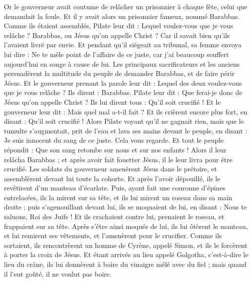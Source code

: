 \begin{multicols}{2}
Or le gouverneur avait coutume de relâcher un prisonnier à chaque fête, celui que demandait la foule.
Et il y avait alors un prisonnier fameux, nommé Barabbas.
Comme ils étaient assemblés, Pilate leur dit : Lequel voulez-vous que je vous relâche ? Barabbas, ou Jésus qu'on appelle Christ ?
Car il savait bien qu'ils l'avaient livré par envie.
Et pendant qu’il siégeait au tribunal, sa femme envoya lui dire : Ne te mêle point de l'affaire de ce juste, car j'ai beaucoup souffert aujourd'hui en songe à cause de lui.
Les principaux sacrificateurs et les anciens persuadèrent la multitude du peuple de demander Barabbas, et de faire périr Jésus.
Et le gouverneur prenant la parole leur dit : Lequel des deux voulez-vous que je vous relâche ? Ils dirent : Barabbas.
Pilate leur dit : Que ferai-je donc de Jésus qu'on appelle Christ ? Ils lui dirent tous : Qu’il soit crucifié !
Et le gouverneur leur dit : Mais quel mal a-t-il fait ? Et ils crièrent encore plus fort, en disant : Qu’il soit crucifié !
Alors Pilate voyant qu'il ne gagnait rien, mais que le tumulte s'augmentait, prit de l'eau et lava ses mains devant le peuple, en disant : Je suis innocent du sang de ce juste. Cela vous regarde.
Et tout le peuple répondit : Que son sang retombe sur nous et sur nos enfants !
Alors il leur relâcha Barabbas ; et après avoir fait fouetter Jésus, il le leur livra pour être crucifié.
Les soldats du gouverneur amenèrent Jésus dans le prétoire, et assemblèrent devant lui toute la cohorte.
Et après l'avoir dépouillé, ils le revêtirent d’un manteau d'écarlate.
Puis, ayant fait une couronne d'épines entrelacées, ils la mirent sur sa tête, et ils lui mirent un roseau dans sa main droite ; puis s'agenouillant devant lui, ils se moquaient de lui, en disant : Nous te saluons, Roi des Juifs !
Et ils crachaient contre lui, prenaient le roseau, et frappaient sur sa tête.
Après s'être ainsi moqués de lui, ils lui ôtèrent le manteau, et lui remirent ses vêtements, et l'amenèrent pour le crucifier.
Comme ils sortaient, ils rencontrèrent un homme de Cyrène, appelé Simon, et ils le forcèrent à porter la croix de Jésus.
Et étant arrivés au lieu appelé Golgotha, c'est-à-dire le lieu du crâne,
ils lui donnèrent à boire du vinaigre mêlé avec du fiel ; mais quand il l’eut goûté, il ne voulut pas boire.

\end{multicols}

